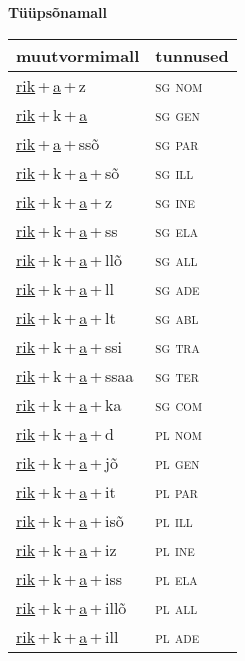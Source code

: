 
\vspace{1.8em}
\begin{minipage}{\textwidth}
\textbf{Tüüpsõnamall \,}\\

\begin{sideways}
\begin{tabular}{l l}
muutvormimall & tunnused \\
\hline
\underline{rik}\,+\,\underline{a}\,+\,z & \textsc{ sg nom } \\
\underline{rik}\,+\,k\,+\,\underline{a} & \textsc{ sg gen } \\
\underline{rik}\,+\,\underline{a}\,+\,ssõ & \textsc{ sg par } \\
\underline{rik}\,+\,k\,+\,\underline{a}\,+\,sõ & \textsc{ sg ill } \\
\underline{rik}\,+\,k\,+\,\underline{a}\,+\,z & \textsc{ sg ine } \\
\underline{rik}\,+\,k\,+\,\underline{a}\,+\,ss & \textsc{ sg ela } \\
\underline{rik}\,+\,k\,+\,\underline{a}\,+\,llõ & \textsc{ sg all } \\
\underline{rik}\,+\,k\,+\,\underline{a}\,+\,ll & \textsc{ sg ade } \\
\underline{rik}\,+\,k\,+\,\underline{a}\,+\,lt & \textsc{ sg abl } \\
\underline{rik}\,+\,k\,+\,\underline{a}\,+\,ssi & \textsc{ sg tra } \\
\underline{rik}\,+\,k\,+\,\underline{a}\,+\,ssaa & \textsc{ sg ter } \\
\underline{rik}\,+\,k\,+\,\underline{a}\,+\,ka & \textsc{ sg com } \\
\underline{rik}\,+\,k\,+\,\underline{a}\,+\,d & \textsc{ pl nom } \\
\underline{rik}\,+\,k\,+\,\underline{a}\,+\,jõ & \textsc{ pl gen } \\
\underline{rik}\,+\,k\,+\,\underline{a}\,+\,it & \textsc{ pl par } \\
\underline{rik}\,+\,k\,+\,\underline{a}\,+\,isõ & \textsc{ pl ill } \\
\underline{rik}\,+\,k\,+\,\underline{a}\,+\,iz & \textsc{ pl ine } \\
\underline{rik}\,+\,k\,+\,\underline{a}\,+\,iss & \textsc{ pl ela } \\
\underline{rik}\,+\,k\,+\,\underline{a}\,+\,illõ & \textsc{ pl all } \\
\underline{rik}\,+\,k\,+\,\underline{a}\,+\,ill & \textsc{ pl ade } \\

\end{tabular}
\end{sideways}
\end{minipage}
